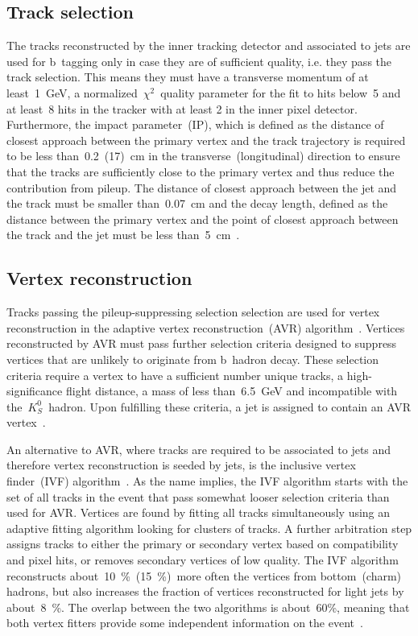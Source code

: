 \subsection{Track selection}
The tracks reconstructed by the inner tracking detector and associated to jets are used for b~tagging only in case they are of sufficient quality, i.e. they pass the track selection. This means they must have a transverse momentum of at least~1~GeV, a normalized~$\chi^2$~quality parameter for the fit to hits below~5 and at least~8 hits in the tracker with at least 2 in the inner pixel detector. Furthermore, the impact parameter~(IP), which is defined as the distance of closest approach between the primary vertex and the track trajectory is required to be less than~0.2~(17)~cm in the transverse~(longitudinal) direction to ensure that the tracks are sufficiently close to the primary vertex and thus reduce the contribution from pileup. The distance of closest approach between the jet and the track must be smaller than~0.07~cm and the decay length, defined as the distance between the primary vertex and the point of closest approach between the track and the jet must be less than~5~cm~\cite{CMS-PAS-BTV-15-001}.

\subsection{Vertex reconstruction}
Tracks passing the pileup-suppressing selection selection are used for vertex reconstruction in the adaptive vertex reconstruction~(AVR) algorithm~\cite{Waltenberger:2008zz}. Vertices reconstructed by AVR must pass further selection criteria designed to suppress vertices that are unlikely to originate from b~hadron decay. These selection criteria require a vertex to have a sufficient number unique tracks, a high-significance flight distance, a mass of less than~6.5~GeV and incompatible with the~$K_S^0$~hadron. Upon fulfilling these criteria, a jet is assigned to contain an AVR vertex~\cite{CMS-PAS-BTV-15-001}.

An alternative to AVR, where tracks are required to be associated to jets and therefore vertex reconstruction is seeded by jets, is the inclusive vertex finder~(IVF) algorithm~\cite{Khachatryan:2011wq}. As the name implies, the IVF algorithm starts with the set of all tracks in the event that pass somewhat looser selection criteria than used for AVR. Vertices are found by fitting all tracks simultaneously using an adaptive fitting algorithm looking for clusters of tracks. A further arbitration step assigns tracks to either the primary or secondary vertex based on compatibility and pixel hits, or removes secondary vertices of low quality. The IVF algorithm reconstructs about~10~\%~(15~\%)~more often the vertices from bottom~(charm) hadrons, but also increases the fraction of vertices reconstructed for light jets by about~8~\%. The overlap between the two algorithms is about~60\%, meaning that both vertex fitters provide some independent information on the event~\cite{CMS-PAS-BTV-15-001}.

